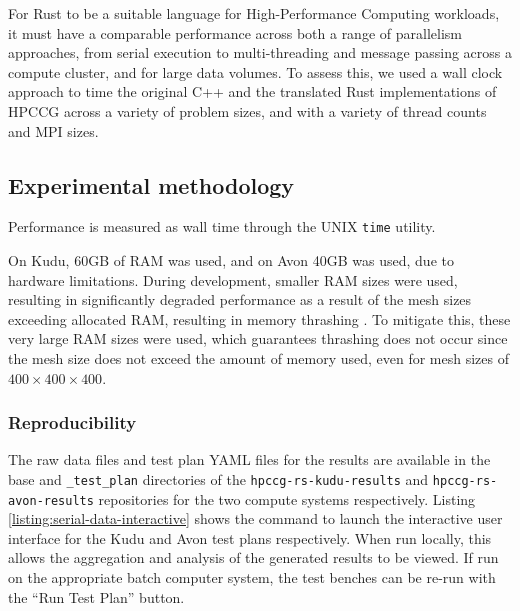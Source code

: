 For Rust to be a suitable language for High-Performance Computing workloads, it must have a comparable performance across both a range of parallelism approaches, from serial execution to multi-threading and message passing across a compute cluster, and for large data volumes. To assess this, we used a wall clock approach to time the original C++ and the translated Rust implementations of HPCCG across a variety of problem sizes, and with a variety of thread counts and MPI sizes.

\subsection{Experimental methodology}
\label{ssec:experimental-methodology}


Performance is measured as wall time through the UNIX \texttt{time} utility.

On Kudu, 60GB of RAM was used, and on Avon 40GB was used, due to hardware limitations. During development, smaller RAM sizes were used, resulting in significantly degraded performance as a result of the mesh sizes exceeding allocated RAM, resulting in memory thrashing \cite{pattersonHennessyComputerOrganisationArchitecture}. To mitigate this, these very large RAM sizes were used, which guarantees thrashing does not occur since the mesh size does not exceed the amount of memory used, even for mesh sizes of $400 \times 400 \times 400$.


\subsubsection{Reproducibility}
\label{sssec:parallelism-approaches-reproducibility}

The raw data files and test plan YAML files for the results are available in the base and \texttt{\_test\_plan} directories of the \texttt{hpccg-rs-kudu-results} and \texttt{hpccg-rs-avon-results} repositories for the two compute systems respectively. Listing \ref{listing:serial-data-interactive} shows the command to launch the interactive user interface for the Kudu and Avon test plans respectively. When run locally, this allows the aggregation and analysis of the generated results to be viewed. If run on the appropriate batch computer system, the test benches can be re-run with the ``Run Test Plan'' button.

